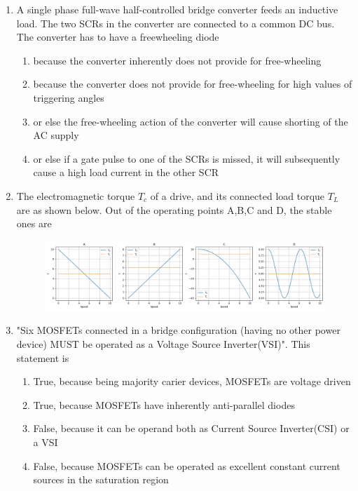 \documentclass[journal]{IEEEtran}
\begin{document}
\begin{enumerate}
    \item A single phase full-wave half-controlled bridge converter feeds an inductive load. The two SCRs in the converter are connected to a common DC bus. The converter has to have a freewheeling diode 
    \begin{enumerate}
            \item because the converter inherently does not provide for free-wheeling
            \item because the converter does not provide for free-wheeling for high values of triggering angles
             \item or else the free-wheeling action of the converter will cause shorting of the AC supply
            \item or else if a gate pulse  to one of the SCRs is missed, it will subsequently cause a high load current in the other SCR
    \end{enumerate}
    \bigskip
\item The electromagnetic torque $T_c$ of a drive, and its connected load torque $T_L$ are as shown below. Out of the operating points A,B,C and D, the stable ones are
\begin{figure}[H]
   \centering
   \includegraphics[width=0.7\linewidth]{figs/fig_1.png}
   \label{stemplot}
\end{figure}
\begin{enumerate}
\end{enumerate}
\bigskip
\item "Six MOSFETs connected in a bridge configuration (having no other power device) MUST be operated as a Voltage Source Inverter(VSI)". This statement is
\begin{enumerate}
    \item True, because being majority carier devices, MOSFETs are voltage driven
    \item True, because MOSFETs have inherently anti-parallel diodes 
    \item False, because it can be operand both as Current Source Inverter(CSI) or a VSI
    \item False, because MOSFETs can be operated as excellent constant current sources in the saturation region

\end{enumerate}
\end{enumerate}
\end{document}
